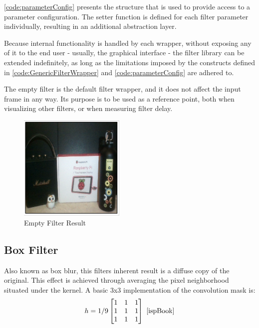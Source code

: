 \cref{code:parameterConfig} presents the structure that is used to provide access to a parameter
configuration. The setter function is defined for each filter parameter individually, resulting in an
additional abstraction layer.

Because internal functionality is handled by each wrapper, without exposing any of it to the end
user - usually, the graphical interface - the filter library can be extended indefinitely, as long as
the limitations imposed by the constructs defined in \cref{code:GenericFilterWrapper} and
\cref{code:parameterConfig} are adhered to.

The empty filter is the default filter wrapper, and it does not affect the input frame in any way. Its 
purpose is to be used as a reference point, both when visualizing other filters, or when measuring filter 
delay.

\begin{figure}[H]
	\includegraphics[width=0.45\textwidth, height=0.45\textwidth]{resources/Empty_4.png}
	\caption{Empty Filter Result}
\end{figure}

\subsection{Box Filter}

Also known as box blur, this filters inherent result is a diffuse copy of the original. This effect is
achieved through averaging the pixel neighborhood situated under the kernel. A basic 3x3 implementation
of the convolution mask is:
\begin{equation}
	h = 1/9
	\begin{bmatrix}
		1 & 1 & 1 \\
		1 & 1 & 1 \\
		1 & 1 & 1 \\
	\end{bmatrix}
	\text{ \cite{ispBook}}
\end{equation}

